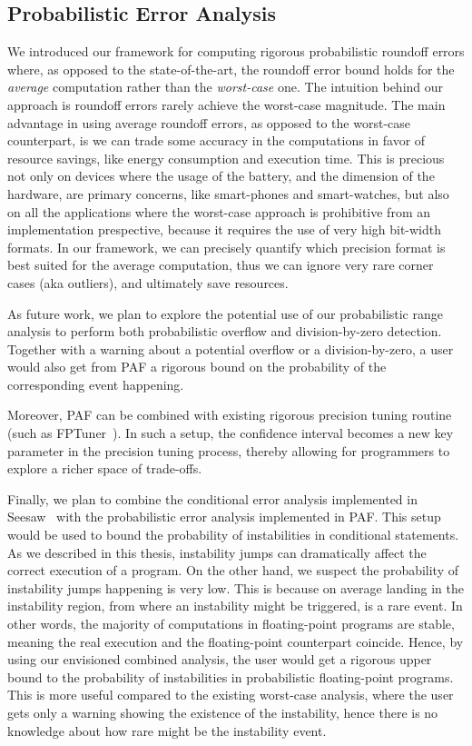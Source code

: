 \subsection{Probabilistic Error Analysis}
%
We introduced our framework for computing rigorous probabilistic roundoff errors where, as opposed to the state-of-the-art, the roundoff error bound holds for the \emph{average} computation rather than the \emph{worst-case} one.
%
The intuition behind our approach is roundoff errors rarely achieve the worst-case magnitude. 
%
The main advantage in using average roundoff errors, as opposed to the worst-case counterpart, is we can trade some accuracy in the computations in favor of resource savings, like energy consumption and execution time.
%
This is precious not only on devices where the usage of the battery, and the dimension of the hardware, are primary concerns, like smart-phones and smart-watches, but also on all the applications where the worst-case approach is prohibitive from an implementation prespective, because it requires the use of very high bit-width formats. 
%
In our framework, we can precisely quantify which precision format is best suited for the average computation, thus we can ignore very rare corner cases (aka outliers), and ultimately save resources.
%

As future work, we plan to explore the potential use of our probabilistic range analysis to perform both probabilistic overflow and division-by-zero detection.
%
Together with a warning about a potential overflow or a division-by-zero, a user would also get from PAF a rigorous bound on the probability of the corresponding event happening.

Moreover, PAF can be combined with existing rigorous precision tuning routine (such as FPTuner~\cite{fptuner}). 
%
In such a setup, the confidence interval becomes a new key parameter in the precision tuning process, thereby allowing for programmers to explore a richer space of trade-offs.
%

Finally, we plan to combine the conditional error analysis implemented in Seesaw~\cite{seesaw} with the probabilistic error analysis implemented in PAF. 
%
This setup would be used to bound the probability of instabilities in conditional statements.
%
As we described in this thesis, instability jumps can dramatically affect the correct execution of a program.
%
On the other hand, we suspect the probability of instability jumps happening is very low.
%
This is because on average landing in the instability region, from where an instability might be triggered, is a rare event.
%
In other words, the majority of computations in floating-point programs are stable, meaning the real execution and the floating-point counterpart coincide.
% 
Hence, by using our envisioned combined analysis, the user would get a rigorous upper bound to the probability of instabilities in probabilistic floating-point programs.
%
This is more useful compared to the existing worst-case analysis, where the user gets only a warning showing the existence of the instability, hence there is no knowledge about how rare might be the instability event.

\newpage

